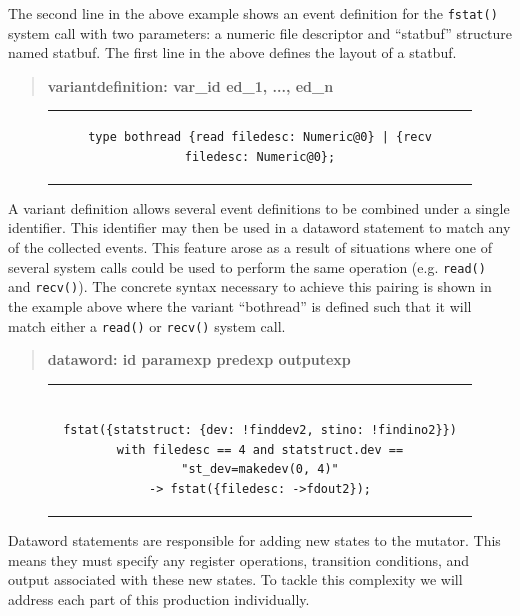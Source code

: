The second line in the above example shows an event
definition for the {\tt fstat()} system call with two parameters: a numeric
file descriptor and ``statbuf'' structure named statbuf.
The first line in the above defines the layout of a statbuf.


\begin{quote}
\centering
\textbf{variantdefinition: var\_id ed\_1, ..., ed\_n}
\end{quote}

\begin{figure}[H]
\centering
\begin{tabular}{c}
\begin{lstlisting}
type bothread {read filedesc: Numeric@0} | {recv filedesc: Numeric@0};
\end{lstlisting}
\end{tabular}
\end{figure}

A variant definition allows several event definitions to be combined under
a single identifier.  This identifier may then be used in a dataword
statement to match any of the collected events.  This feature arose as a
result of situations where one of several system calls could be used to
perform the same operation (e.g. {\tt read()} and {\tt recv()}).  The
concrete syntax necessary to achieve this pairing is shown in the example
above where the variant ``bothread'' is defined such that it will match
either a {\tt read()} or {\tt recv()} system call.

\begin{quote}
\centering
\textbf{dataword: id paramexp predexp outputexp}
\end{quote}

\begin{figure}[H]
\centering
\begin{tabular}{c}
\begin{lstlisting}

fstat({statstruct: {dev: !finddev2, stino: !findino2}})
with filedesc == 4 and statstruct.dev == "st_dev=makedev(0, 4)"
-> fstat({filedesc: ->fdout2});

\end{lstlisting}
\end{tabular}
\end{figure}

Dataword statements are responsible for adding new states to the
mutator.  This means they must specify any register operations,
transition conditions, and output associated with these new states.  To
tackle this complexity we will address each part of this production
individually.


